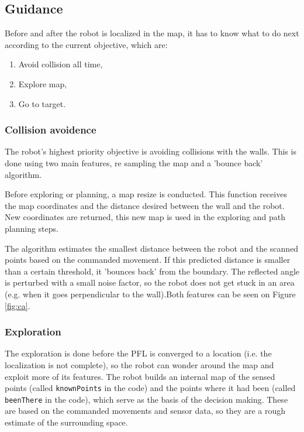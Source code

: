 \subsection{Guidance}

	Before and after the robot is localized in the map, it has to know what to do next according to the current objective, which are:
	\begin{enumerate}
		\item Avoid collision all time,
		\item Explore map,
		\item Go to target.
	\end{enumerate}
	
	\subsubsection{Collision avoidence}
	
		The robot's highest priority objective is avoiding collisions with the walls. This is done using two main features, re sampling the map and a 'bounce back' algorithm.
		
		Before exploring or planning, a map resize is conducted. This function receives the map coordinates and the distance desired between the wall and the robot. New coordinates are returned, this new map is used in the exploring and path planning steps.
		 
		The algorithm estimates the smallest distance between the robot and the scanned points based on the commanded movement. If this predicted distance is smaller than a certain threshold, it 'bounces back' from the boundary. The reflected angle is perturbed with a small noise factor, so the robot does not get stuck in an area (e.g. when it goes perpendicular to the wall).Both features can be seen on Figure \ref{fig:ca}.
		
%		    
	
	\subsubsection{Exploration}
	
		The exploration is done before the PFL is converged to a location (i.e. the localization is not complete), so the robot can wonder around the map and exploit more of its features. The robot builds an internal map of the sensed points (called {\tt knownPoints} in the code) and the points where it had been (called {\tt beenThere} in the code), which serve as the basis of the decision making. These are based on the commanded movements and sensor data, so they are a rough estimate of the surrounding space. 
		
